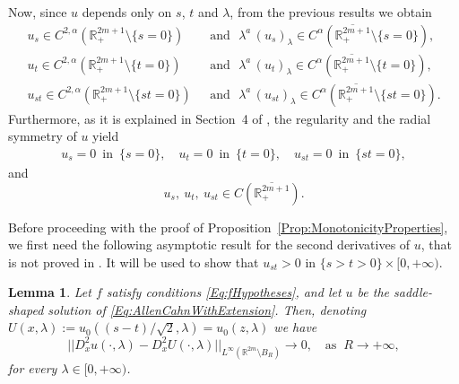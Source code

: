 \documentclass[12pt,reqno]{amsart}
\newtheorem{lemma}[theorem]{Lemma}
\theoremstyle{definition}
\theoremstyle{remark}
\newcommand{\con}[1]{\mathbb{#1}}
\newcommand{\R}{\con{R}} %
\numberwithin{equation}{section}
\begin{document}
Now, since $u$ depends only on $s$, $t$ and $\lambda$, from the previous results we obtain
\begin{align*}
u_s \in C^{2,\alpha}(\R_+^{2m+1}\setminus\{s=0\}) \,\, &\text{ and }\,\, \lambda^a\,(u_s)_\lambda \in C^{\alpha}(\overline{\R_+^{2m+1}}\setminus\{s=0\}),\\
u_t \in C^{2,\alpha}(\R_+^{2m+1}\setminus\{t=0\}) \,\, &\text{ and }\,\, \lambda^a\,(u_t)_\lambda \in C^{\alpha}(\overline{\R_+^{2m+1}}\setminus\{t=0\}),\\
u_{st} \in C^{2,\alpha}(\R_+^{2m+1}\setminus\{st=0\}) \,\, &\text{ and }\,\, \lambda^a\,(u_{st})_\lambda \in C^{\alpha}(\overline{\R_+^{2m+1}}\setminus\{st=0\}).
\end{align*}
Furthermore, as it is explained in Section~4 of \cite{Cabre-Saddle}, the regularity and the radial symmetry of $u$ yield
\begin{align*}
u_s=0 \,\text{ in } \, \{s=0\}, \quad 
u_t=0 \,\text{ in } \, \{t=0\},  \quad
u_{st}=0 \,\text{ in } \, \{st=0\},
\end{align*}
and
$$ u_s, \ u_t,\ u_{st} \in C(\overline{\R^{2m+1}_+}).  $$


Before proceeding with the proof of Proposition~\ref{Prop:MonotonicityProperties}, we first need the following asymptotic result for the second derivatives of $u$, that is not proved in \cite{Cinti-Saddle, Cinti-Saddle2}. It will be used to show that $u_{st}>0$ in $\{s>t>0\}\times [0,+\infty)$.

\begin{lemma}
\label{Lemma:AsymptoticSecondDerivative}
Let $f$ satisfy conditions \eqref{Eq:fHypotheses}, and let $u$ be the saddle-shaped solution of \eqref{Eq:AllenCahnWithExtension}. Then, denoting $U(x,\lambda) := u_0((s - t)/\sqrt{2},\lambda) = u_0(z,\lambda)$ we have
$$ ||D^2_x u(\cdot,\lambda) - D^2_x U(\cdot,\lambda)||_{L^\infty(\R^{2m}\setminus B_R)} \to 0, \ \ \ \text{ as } \ R\to+\infty, $$
for every $\lambda \in [0,+\infty)$.
\end{lemma}
\end{document}
